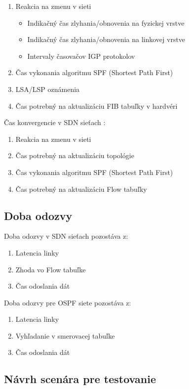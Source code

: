 \documentclass[conference]{IEEEtran}
\begin{document}
\begin{enumerate}
	\item{Reakcia na zmenu v sieti}
		\begin{itemize}
			\item{Indikačný čas zlyhania/obnovenia na fyzickej vrstve}
			\item{Indikačný čas zlyhania/obnovenia na linkovej vrstve}
			\item{Intervaly časovačov IGP protokolov}
		\end{itemize}
	\item{Čas vykonania algoritmu SPF (Shortest Path First)}
	\item{LSA/LSP oznámenia}
	\item{Čas potrebný na aktualizáciu FIB tabuľky v hardvéri}
\end{enumerate}

Čas konvergencie v SDN sieťach \cite{nineth}:

\begin{enumerate}
	\item{Reakcia na zmenu v sieti}
	\item{Čas potrebný na aktualizáciu topológie}
	\item{Čas vykonania algoritmu SPF (Shortest Path First)}
	\item{Čas potrebný na aktualizáciu Flow tabuľky}
\end{enumerate}

\subsection{Doba odozvy}
Doba odozvy v SDN sieťach pozostáva z:

\begin{enumerate}
	\item{Latencia linky}
	\item{Zhoda vo Flow tabuľke}
	\item{Čas odoslania dát}
\end{enumerate}

Doba odozvy pre OSPF siete pozostáva z:

\begin{enumerate}
	\item{Latencia linky}
	\item{Vyhľadanie v smerovacej tabuľke}
	\item{Čas odoslania dát}
\end{enumerate}

\subsection{Návrh scenára pre testovanie}
\end{document}
